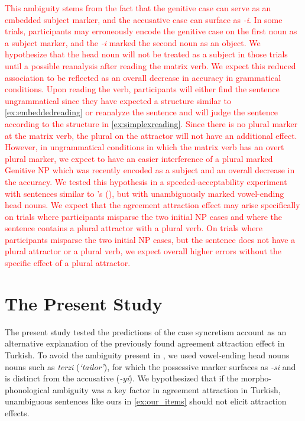 \documentclass[apacite,linguex]{glossa}\usepackage[]{graphicx}\usepackage[]{color}
\newcommand{\revise}[1]{\textcolor{red}{#1}}
\begin{document}
\revise{This ambiguity stems from the fact that the genitive case can serve as an embedded subject marker, and the accusative case can surface as \textit{-i}. In some trials, participants may erroneously encode the genitive case on the first noun as a subject marker, and the \textit{-i} marked the second noun as an object. We hypothesize that the head noun will not be treated as a subject in those trials until a possible reanalysis after reading the matrix verb. We expect this reduced association to be reflected as an overall decrease in accuracy in grammatical conditions. Upon reading the verb, participants will either find the sentence ungrammatical since they have expected a structure similar to \ref{ex:embeddedreading} or reanalyze the sentence and will judge the sentence according to the structure in \ref{ex:simplexreading}. Since there is no plural marker at the matrix verb, the plural on the attractor will not have an additional effect. However, in ungrammatical conditions in which the matrix verb has an overt plural marker, we expect to have an easier interference of a plural marked Genitive NP which was recently encoded as a subject and an overall decrease in the accuracy. We tested this hypothesis in a speeded-acceptability experiment with sentences similar to \citeauthor{LagoEtAl:2019}'s (\citeyear{LagoEtAl:2019}), but with unambiguously marked vowel-ending head nouns. We expect that the agreement attraction effect may arise specifically on trials where participants misparse the two initial NP cases and where the sentence contains a plural attractor with a plural verb. On trials where participants misparse the two initial NP cases, but the sentence does not have a plural attractor or a plural verb, we expect overall higher errors without the specific effect of a plural attractor.}

\section{The Present Study}

The present study tested the predictions of the case syncretism account as an alternative explanation of the previously found agreement attraction effect in Turkish. To avoid the ambiguity present in \citet{LagoEtAl:2019}, we used vowel-ending head nouns nouns such as \textit{terzi} (\textit{`tailor'}), for which the possessive marker surfaces as \textit{-si} and is distinct from the accusative (\textit{-yi}). We hypothesized that if the morpho-phonological ambiguity was a key factor in agreement attraction in Turkish, unambiguous sentences like ours in \ref{ex:our_items} should not elicit attraction effects.
\end{document}
